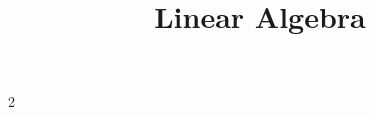 \documentclass[letterpaper]{report}
\title{Linear Algebra}
\begin{document}
    \maketitle
    \tableofcontents
    \allowdisplaybreaks[4]
    \newpage
    \begin{multicols}{2}
    \end{multicols}
\end{document}
